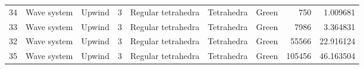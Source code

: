 \begin{tabular}{lllrlllrr}
34  &       Wave system &                         Upwind &               3 &              Regular tetrahedra &             Tetrahedra  &                                Green &                      750 &                         1.009681 \\
33  &       Wave system &                         Upwind &               3 &              Regular tetrahedra &             Tetrahedra  &                                Green &                     7986 &                         3.364831 \\
32  &       Wave system &                         Upwind &               3 &              Regular tetrahedra &             Tetrahedra  &                                Green &                    55566 &                        22.916124 \\
35  &       Wave system &                         Upwind &               3 &              Regular tetrahedra &             Tetrahedra  &                                Green &                   105456 &                        46.163504 \\
\bottomrule
\end{tabular}
